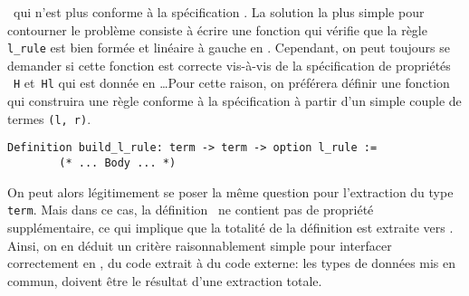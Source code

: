 \ocaml\ qui n'est plus conforme à la spécification \coq. La solution la plus simple pour contourner le problème consiste 
à écrire une fonction qui vérifie que la règle \lstinline!l_rule! est bien formée et linéaire à gauche en \ocaml.
Cependant, on peut toujours se demander si cette fonction est correcte vis-à-vis de la spécification de propriétés
~\lstinline!H! et~\lstinline!Hl! qui est donnée en \coq\dots Pour cette raison, on préférera définir une fonction qui 
construira une règle conforme à la spécification à partir d'un simple couple de termes \lstinline!(l, r)!.
\switchlstcoq
\begin{lstlisting}
Definition build_l_rule: term -> term -> option l_rule :=
        (* ... Body ... *)
\end{lstlisting}
On peut alors légitimement se poser la même question pour l'extraction du type \lstinline!term!. 
Mais dans ce cas, la définition \coq\ ne contient pas de propriété supplémentaire, ce qui implique
que la totalité de la définition est extraite vers \ocaml.
Ainsi, on en déduit un critère raisonnablement simple pour interfacer correctement en \ocaml, du code extrait
à du code externe: les types de données mis en commun, doivent être le résultat d'une extraction totale.


